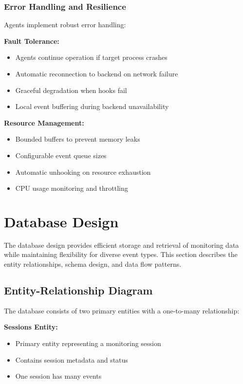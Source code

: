 \subsubsection{Error Handling and Resilience}

Agents implement robust error handling:

\textbf{Fault Tolerance:}
\begin{itemize}
    \item Agents continue operation if target process crashes
    \item Automatic reconnection to backend on network failure
    \item Graceful degradation when hooks fail
    \item Local event buffering during backend unavailability
\end{itemize}

\textbf{Resource Management:}
\begin{itemize}
    \item Bounded buffers to prevent memory leaks
    \item Configurable event queue sizes
    \item Automatic unhooking on resource exhaustion
    \item CPU usage monitoring and throttling
\end{itemize}

\section{Database Design}

The database design provides efficient storage and retrieval of monitoring data while maintaining flexibility for diverse event types. This section describes the entity relationships, schema design, and data flow patterns.

\subsection{Entity-Relationship Diagram}

The database consists of two primary entities with a one-to-many relationship:

\textbf{Sessions Entity:}
\begin{itemize}
    \item Primary entity representing a monitoring session
    \item Contains session metadata and status
    \item One session has many events
\end{itemize}

